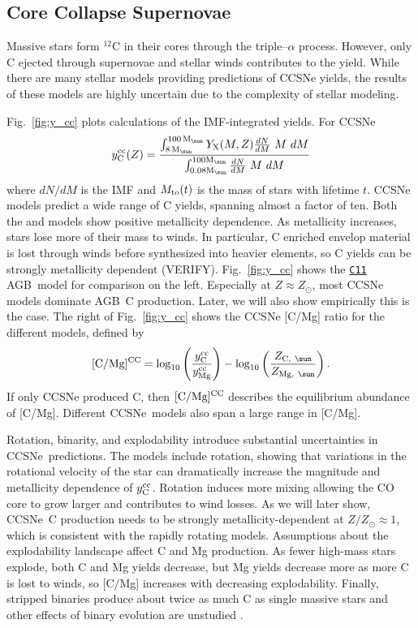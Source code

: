 \documentclass[fleqn,
usenatbib]{mnras}
\newcommand{\cxi}{\texttt{\hyperlink{C11}{C11}}}
\newcommand{\agb}{AGB}
\newcommand{\cc}{CCSNe}
\newcommand{\imf}{IMF}
\newcommand{\Ycc}{\ensuremath{y_{\rm C}^{\rm cc}}}
\newcommand{\Yoc}{\ensuremath{y_{\rm Mg}^{\rm cc}}}
\newcommand{\y}{Y}
\newcommand{\Mo}{%
    \ifmmode {\rm M}_{\sun}%
    \else {M$_{\sun}$}%
    \fi}
\begin{document}
\subsection{Core Collapse Supernovae}


Massive stars form $^{12}$C in their cores through the triple--$\alpha$ process.
However, only C ejected through supernovae and stellar winds contributes to the yield. 
While there are many stellar models providing predictions of \cc{} yields, the results of these models are highly uncertain due to the complexity of stellar modeling.

Fig.~\ref{fig:y_cc} plots calculations of the \imf-integrated yields.
For \cc\, 
\begin{equation} \label{eq:imf-cc-yield}
    \Ycc(Z) = 
    \frac{
    \int_{8\,\Mo}^{100\,\Mo} 
    \y_{\rm X}(M, Z)
    \frac{dN}{dM}\ M\ dM
}
{
    \int_{0.08\Mo}^{100\Mo} \frac{dN}{dM}\ M\ dM
}
\end{equation}
where ${dN}/{dM}$ is the \imf{} and $M_{\rm to}(t)$ is the mass of stars with lifetime $t$.%
\cc{} models predict a wide range of C yields, spanning almost a factor of ten. 
Both the \citet{NKT13} and \cite{LC18} models show positive metallicity dependence. 
As metallicity increases, stars lose more of their mass to winds. In particular, C enriched envelop material is lost through winds before synthesized into heavier elements, so C yields can be strongly metallicity dependent (VERIFY).
Fig.~\ref{fig:y_cc} shows the \cxi{} \agb\ model for comparison on the left. Especially at $Z\approx Z_\odot$, most \cc{} models dominate \agb\ C production. Later, we will also show empirically this is the case.
The right of Fig.~\ref{fig:y_cc} shows the \cc{} [C/Mg] ratio for the different models, defined by
\begin{equation}\label{eq:c_mg_cc}
    {\rm [C/Mg]^{CC}} = \log_{10}\left( \frac{\Ycc}{\Yoc}\right) - \log_{10} \left( \frac{Z_{{\rm C},\ \sun }}{Z_{{\rm Mg},\ \sun }} \right).
\end{equation}
If only \cc{} produced C, then ${\rm [C/Mg]^{CC}}$ describes the equilibrium abundance of [C/Mg].
Different \cc\ models also span a large range in [C/Mg]. 

Rotation, binarity, and explodability introduce substantial uncertainties in \cc\ predictions. The \cite{LC18} models include rotation, showing that variations in the rotational velocity of the star can dramatically increase the magnitude and metallicity dependence of $\Ycc$. Rotation induces more mixing allowing the CO core to grow larger and contributes to wind losses. As we will later show, \cc\ C production needs to be strongly metallicity-dependent at $Z/Z_\odot \approx 1$, which is consistent with the \cite{LC18} rapidly rotating models.
Assumptions about the explodability landscape affect C and Mg production. As fewer high-mass stars explode, both C and Mg yields decrease, but Mg yields decrease more as more C is lost to winds, so [C/Mg] increases with decreasing explodability. 
Finally, stripped binaries produce about twice as much C as single massive stars and other effects of binary evolution are unstudied \citep{farmer+21}.
\end{document}
